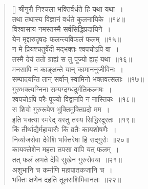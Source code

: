 \documentclass[twoside,12pt,notitlepage]{book}
\begin{document}
\begin{verse}[\versewidth]
श्रीगुरौ निश्चला भक्तिर्वर्धते हि यथा यथा~।\\[-6pt]
तथा तथास्य विज्ञानं वर्धते कुलनायिके~॥१४॥\\
विश्वासाय नमस्तस्मै  सर्वसिद्धिप्रदायिने~।\\[-6pt]
येन मृद्दारुदृषदः फलन्त्यविफलं फलम्~॥१५॥\\
न मे प्रियश्चतुर्वेदी मद्भक्तः श्वपचोऽपि वा~।\\[-6pt]
तस्मै देयं ततो ग्राह्यं स तु पूज्यो ह्यहं यथा~॥१६॥\footA \\
मनसापि न काङ्क्षन्ते यान् कामाननुजीविनः~।\\[-6pt]
सम्पादयन्ति तान् सर्वान् स्वामिनो भक्तवत्सलाः~॥१७॥\\
गुरुभक्त्यग्निना सम्यग्दग्धदुर्मतिकल्मषः~।\\[-6pt]
श्वपचोऽपि परैः पूज्यो विद्वानपि न नास्तिकः~॥१८॥\\
 स शिवो गुरुरूपेण भुक्तिमुक्तिप्रदो मम~।\\[-6pt]
 इति भक्त्या स्मरेद् यस्तु तस्य सिद्धिरदूरतः~॥१९॥\\
 किं तीर्थाद्यैर्महायासैः किं व्रतैः कायशोषणैः~।\\[-6pt]
 निर्व्याजसेवा देवेशि भक्तिरेषा हि सद्गुरोः~॥२०॥\\
 कायक्लेशेन महता तपसा वापि यत् फलम्~।\\[-6pt]
 तत् फलं लभते देवि सुखेन गुरुसेवया~॥२१॥\\
 अशुभानि च कर्माणि महापातकजानि च~।\\[-6pt]
 भक्तिः क्षणेन दहति तूलराशिमिवानलः~॥२२॥
\end{verse}
\end{document}
